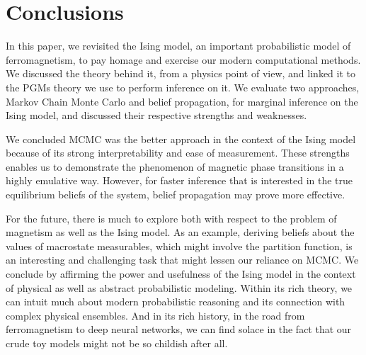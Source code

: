 \documentclass{article}
\begin{document}
\section{Conclusions}
%
%
%
%
%
In this paper, we revisited the Ising model, an important probabilistic model of 
ferromagnetism, to pay homage and exercise our modern computational methods. 
We discussed the theory behind it, from a physics point of view, and linked it 
to the PGMs theory we use to perform inference on it. 
We evaluate two approaches, Markov Chain Monte Carlo and belief propagation, 
for marginal inference on the Ising model, and discussed their respective 
strengths and weaknesses. 

We concluded MCMC was the better approach in the context of the Ising model 
because of its strong interpretability and ease of measurement. 
These strengths enables us to demonstrate the phenomenon of magnetic phase 
transitions in a highly emulative way. 
However, for faster inference that is interested in the true equilibrium beliefs 
of the system, belief propagation may prove more effective. 

For the future, there is much to explore both with respect to the problem of 
magnetism as well as the Ising model. 
As an example, deriving beliefs about the values of macrostate measurables, 
which might involve the partition function, is an interesting and challenging 
task that might lessen our reliance on MCMC. 
We conclude by affirming the power and usefulness of the Ising model in the 
context of physical as well as abstract probabilistic modeling. 
Within its rich theory, we can intuit much about modern probabilistic 
reasoning and its connection with complex physical ensembles. 
And in its rich history, in the road from ferromagnetism to deep neural 
networks, we can find solace in the fact that our crude toy models might not be 
so childish after all. 
%
%
%
%
%


\end{document}
